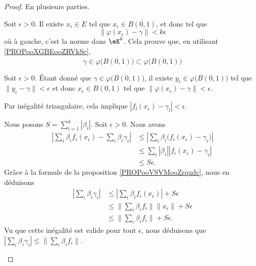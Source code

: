 \begin{proof}
	En plusieurs parties.
	\begin{subproof}
		\spitem[\ref{ITEMooDMOOooPJtgTE} \( \Rightarrow\) \ref{ITEMooAQAJooHmSXGW}]
		Soit \( \epsilon>0\). Il existe \( x_{\epsilon}\in E\) tel que \( x_{\epsilon}\in \overline{B(0,1)}\), et donc tel que
		\begin{equation}
			\| \varphi(x_{\epsilon})-\gamma \|<k\epsilon
		\end{equation}
		où à gauche, c'est la norme dans \( \eK^k\). Cela prouve que, en utilisant \ref{PROPooXGBEooZRVkSc},
		\begin{equation}
			\gamma\in\varphi\big( \overline{B(0,1)} \big)\subset\overline{\varphi\big( B(0,1) \big)}
		\end{equation}

		\spitem[\ref{ITEMooAQAJooHmSXGW} \( \Rightarrow\) \ref{ITEMooDMOOooPJtgTE}]
		Soit \( \epsilon>0\). Étant donné que \( \gamma\in\overline{\varphi\big( B(0,1) \big)}\), il existe \( y_{\epsilon}\in \varphi\big( B(0,1) \big)\) tel que \( \| y_{\epsilon}-\gamma \|<\epsilon\) et donc \( x_{\epsilon}\in B(0,1)\) tel que \( \| \varphi(x_{\epsilon})-\gamma \|<\epsilon\).

		Par inégalité triangulaire, cela implique \( | f_l(x_{\epsilon})-\gamma_l |<\epsilon\).

		\spitem[\ref{ITEMooDMOOooPJtgTE} \( \Rightarrow\) \ref{ITEMooXJKAooFHUsOv}]
		Nous posons \( S=\sum_{i=1}^k| \beta_i |\). Soit \( \epsilon>0\). Nous avons
		\begin{subequations}
			\begin{align}
				| \sum_i\beta_if_i(x_{\epsilon})-\sum_i\beta_i\gamma_i | & \leq | \sum_i\beta_i\big( f_i(x_{\epsilon})-\gamma_i \big)| \\
				                                                         & \leq \sum_i| \beta_i || f_i(x_{\epsilon})-\gamma_i |        \\
				                                                         & \leq S\epsilon.
			\end{align}
		\end{subequations}
		Grâce à la formule de la proposition \ref{PROPooVSVMooZrqxdc}, nous en déduisons
		\begin{subequations}
			\begin{align}
				| \sum_i\beta_i\gamma_i | & \leq | \sum_i\beta_if_i(x_{\epsilon}) |+S\epsilon       \\
				                          & \leq \| \sum_i\beta_if_i \|\| x_{\epsilon} \|+S\epsilon \\
				                          & \leq \| \sum_i\beta_if_i \|+S\epsilon.
			\end{align}
		\end{subequations}
		Vu que cette inégalité est valide pour tout \( \epsilon\), nous déduisons que \( | \sum_i\beta_i\gamma_i |\leq \| \sum_i\beta_if_i \|\).


\end{subproof}
\end{proof}

